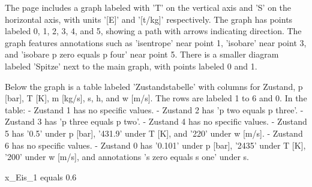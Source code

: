 The page includes a graph labeled with 'T' on the vertical axis and 'S' on the horizontal axis, with units '[E]' and '[t/kg]' respectively. The graph has points labeled 0, 1, 2, 3, 4, and 5, showing a path with arrows indicating direction. The graph features annotations such as 'isentrope' near point 1, 'isobare' near point 3, and 'isobare p zero equals p four' near point 5. There is a smaller diagram labeled 'Spitze' next to the main graph, with points labeled 0 and 1.

Below the graph is a table labeled 'Zustandstabelle' with columns for Zustand, p [bar], T [K], m [kg/s], s, h, and w [m/s]. The rows are labeled 1 to 6 and 0. In the table:
- Zustand 1 has no specific values.
- Zustand 2 has 'p two equals p three'.
- Zustand 3 has 'p three equals p two'.
- Zustand 4 has no specific values.
- Zustand 5 has '0.5' under p [bar], '431.9' under T [K], and '220' under w [m/s].
- Zustand 6 has no specific values.
- Zustand 0 has '0.101' under p [bar], '2435' under T [K], '200' under w [m/s], and annotations 's zero equals s one' under s.

x_Eis_1 equals 0.6